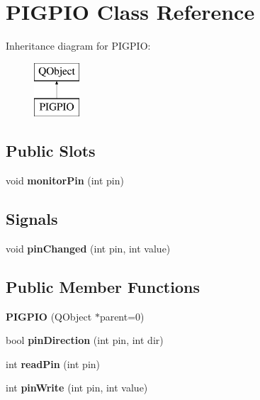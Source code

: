 \hypertarget{class_p_i_g_p_i_o}{}\section{P\+I\+G\+P\+IO Class Reference}
\label{class_p_i_g_p_i_o}
Inheritance diagram for P\+I\+G\+P\+IO\+:\begin{figure}[H]
\begin{center}
\leavevmode
\includegraphics[height=2.000000cm]{class_p_i_g_p_i_o}
\end{center}
\end{figure}
\subsection*{Public Slots}
\begin{DoxyCompactItemize}
\item 
\mbox{\label{class_p_i_g_p_i_o_aac1cb359875f9e188797f6246fc63641}} 
void {\bfseries monitor\+Pin} (int pin)
\end{DoxyCompactItemize}
\subsection*{Signals}
\begin{DoxyCompactItemize}
\item 
\mbox{\label{class_p_i_g_p_i_o_ad042c24e5cfaf8a505c1a08afe5cec53}} 
void {\bfseries pin\+Changed} (int pin, int value)
\end{DoxyCompactItemize}
\subsection*{Public Member Functions}
\begin{DoxyCompactItemize}
\item 
\mbox{\label{class_p_i_g_p_i_o_ad16734c836686d7d1c565774d64292fe}} 
{\bfseries P\+I\+G\+P\+IO} (Q\+Object $\ast$parent=0)
\item 
\mbox{\label{class_p_i_g_p_i_o_a0a5a0e07fdf57c7a922ba9980fc0ea7b}} 
bool {\bfseries pin\+Direction} (int pin, int dir)
\item 
\mbox{\label{class_p_i_g_p_i_o_a30eb801cfb8fb73e290aacd29464ec2c}} 
int {\bfseries read\+Pin} (int pin)
\item 
\mbox{\label{class_p_i_g_p_i_o_a1f676b4254f7959c3df82b8d326bc450}} 
int {\bfseries pin\+Write} (int pin, int value)
\end{DoxyCompactItemize}
